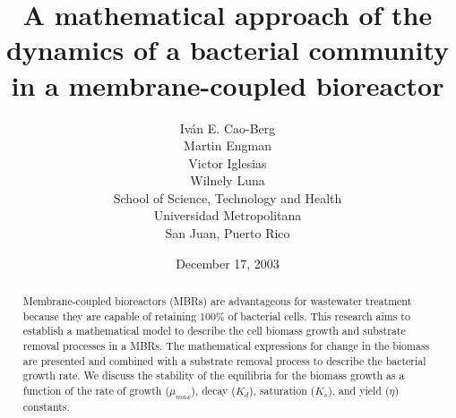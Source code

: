 \documentclass{article}
\begin{document}
\title{A mathematical approach of the dynamics of a bacterial community in a membrane-coupled bioreactor}
\author{Iv\'an E. Cao-Berg \\
        Martin Engman\\
        Victor Iglesias \\
        Wilnely Luna \\
        {\small School of Science, Technology and Health} \\
        {\small Universidad Metropolitana} \\
        {\small San Juan, Puerto Rico}}
	\date{December 17, 2003}
\maketitle

\begin{abstract}
\renewcommand{\baselinestretch}{1.5}
\noindent Membrane-coupled bioreactors (MBRs) are advantageous for
wastewater treatment because they are capable of retaining 100\%
of bacterial cells. This research aims to establish a mathematical
model to describe the cell biomass growth and substrate removal
processes in a MBRs. The mathematical expressions for change in
the biomass are presented and combined with a substrate removal
process to describe the bacterial growth rate. We discuss the
stability of the equilibria for the biomass growth as a function
of the rate of growth ($\mu_{max}$), decay ($K_d$), saturation
($K_s$), and yield ($\eta$) constants.
\end{abstract}
\end{document}
